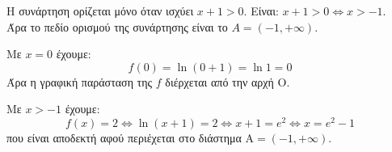 \begin{alist}
\item Η συνάρτηση ορίζεται μόνο όταν ισχύει $x + 1 > 0$. Είναι: $x + 1 > 0 \Leftrightarrow x > -1$. \\
Άρα το πεδίο ορισμού της συνάρτησης είναι το $A = (-1, +\infty)$.
\item Με $x=0$ έχουμε:
\[f(0) = \ln(0 + 1) = \ln 1 = 0\]
Άρα η γραφική παράσταση της $f$ διέρχεται από την αρχή $\text{O}$.
\item Με $x > -1$ έχουμε:
\[f(x) = 2 \Leftrightarrow \ln(x + 1) = 2 \Leftrightarrow x + 1 = e^2 \Leftrightarrow x = e^2 - 1\]
που είναι αποδεκτή αφού περιέχεται στο διάστημα $\text{A} = (-1, +\infty)$.
\end{alist}

